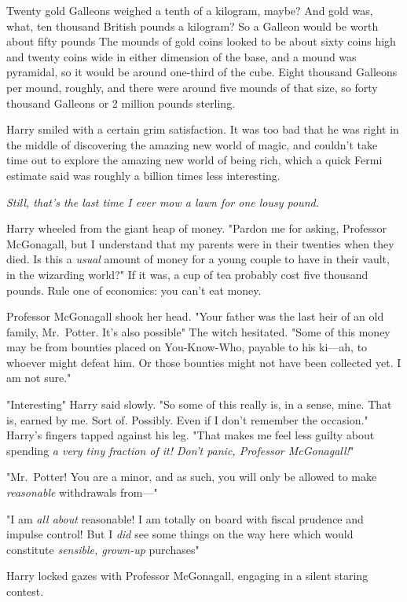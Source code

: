 Twenty gold Galleons weighed a tenth of a kilogram, maybe? And gold was, what,
ten thousand British pounds a kilogram? So a Galleon would be worth about fifty
pounds{\el} The mounds of gold coins looked to be about sixty coins high and
twenty coins wide in either dimension of the base, and a mound was pyramidal,
so it would be around one-third of the cube. Eight thousand Galleons per mound,
roughly, and there were around five mounds of that size, so forty thousand
Galleons or 2 million pounds sterling.

Harry smiled with a certain grim satisfaction. It was too bad that he
was right in the middle of discovering the amazing new world of magic, and
couldn't take time out to explore the amazing new world of being rich, which a
quick Fermi estimate said was roughly a billion times less interesting.

\emph{Still, that's the last time I ever mow a lawn for one lousy pound.}

Harry wheeled from the giant heap of money. "Pardon me for asking, Professor
McGonagall, but I understand that my parents were in their twenties when they
died. Is this a \emph{usual} amount of money for a young couple to have in
their vault, in the wizarding world?" If it was, a cup of tea probably cost
five thousand pounds. Rule one of economics: you can't eat money.

Professor McGonagall shook her head. "Your father was the last heir of an old
family, Mr.~Potter. It's also possible{\el}" The witch hesitated. "Some of
this money may be from bounties placed on You-Know-Who, payable to his ki—ah,
to whoever might defeat him. Or those bounties might not have been collected
yet. I am not sure."

"Interesting{\el}" Harry said slowly. "So some of this really is, in a
sense, mine. That is, earned by me. Sort of. Possibly. Even if I don't remember
the occasion." Harry's fingers tapped against his leg. "That makes me
feel less guilty about spending \emph{a very tiny fraction of it! Don't panic,
Professor McGonagall!}"

"Mr.~Potter! You are a minor, and as such, you will only be allowed to make
\emph{reasonable} withdrawals from—"

"I am \emph{all about} reasonable! I am totally on board with fiscal prudence
and impulse control! But I \emph{did} see some things on the way here which
would constitute \emph{sensible, grown-up} purchases{\el}"

Harry locked gazes with Professor McGonagall, engaging in a silent staring
contest.


